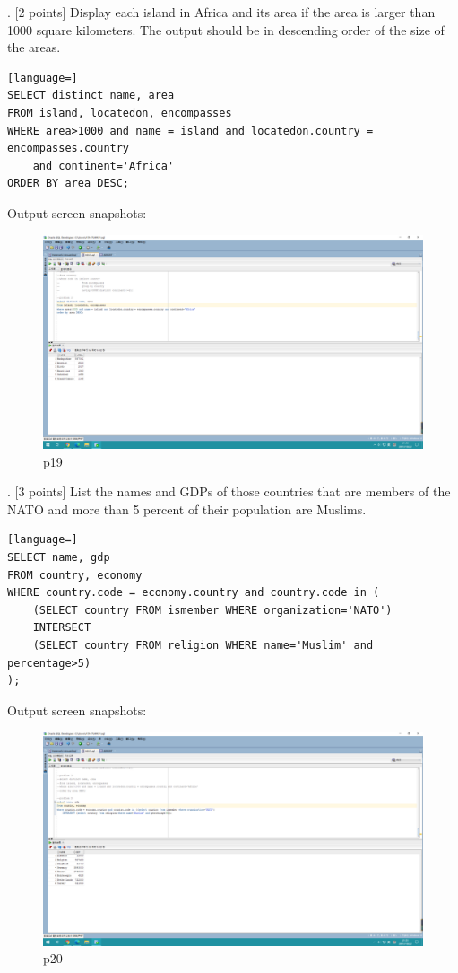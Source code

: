 \documentclass[]{article}
\begin{document}
	. [2 points] Display each island in Africa and its area if the area is larger than 1000 square kilometers. The output should be in descending order of the size of the areas.    \\
	
	\begin{lstlisting}[language=] 
SELECT distinct name, area
FROM island, locatedon, encompasses
WHERE area>1000 and name = island and locatedon.country = encompasses.country 
	and continent='Africa'
ORDER BY area DESC;
	\end{lstlisting} 
	Output screen snapshots:
	\begin{figure}[H]
		\centering
		\includegraphics[width=0.9\linewidth]{../screen/p19}
		\caption{p19}
		\label{fig:p19}
	\end{figure}
	
	. [3 points] List the names and GDPs of those countries that are members of the NATO and more than 5 percent of their population are Muslims.   \\
	
	\begin{lstlisting}[language=] 
SELECT name, gdp
FROM country, economy
WHERE country.code = economy.country and country.code in (
	(SELECT country FROM ismember WHERE organization='NATO')
	INTERSECT
	(SELECT country FROM religion WHERE name='Muslim' and percentage>5)
);
	\end{lstlisting} 
	Output screen snapshots:
	\begin{figure}[H]
		\centering
		\includegraphics[width=0.7\linewidth]{../screen/p20}
		\caption{p20}
		\label{fig:p20}
	\end{figure}
	
\end{document}
